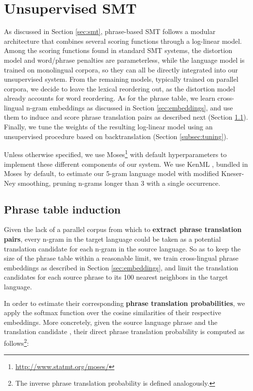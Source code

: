 \documentclass[11pt,a4paper]{article}
\begin{document}
\section{Unsupervised SMT} \label{sec:system}

As discussed in Section \ref{sec:smt}, phrase-based SMT follows a modular architecture that combines several scoring functions through a log-linear model. Among the scoring functions found in standard SMT systems, the distortion model and word/phrase penalties are parameterless, while the language model is trained on monolingual corpora, so they can all be directly integrated into our unsupervised system. From the remaining models, typically trained on parallel corpora, we decide to leave the lexical reordering out, as the distortion model already accounts for word reordering. As for the phrase table, we learn cross-lingual n-gram embeddings as discussed in Section \ref{sec:embeddings}, and use them to induce and score phrase translation pairs as described next (Section \ref{subsec:phrase_table_induction}). Finally, we tune the weights of the resulting log-linear model using an unsupervised procedure based on backtranslation (Section \ref{subsec:tuning}).

Unless otherwise specified, we use Moses\footnote{\url{http://www.statmt.org/moses/}} with default hyperparameters to implement these different components of our system. We use KenML \citep{heafield2013scalable}, bundled in Moses by default, to estimate our 5-gram language model with modified Kneser-Ney smoothing, pruning n-grams longer than 3 with a single occurrence.


\subsection{Phrase table induction} \label{subsec:phrase_table_induction}

Given the lack of a parallel corpus from which to \textbf{extract phrase translation pairs}, every n-gram in the target language could be taken as a potential translation candidate for each n-gram in the source language. So as to keep the size of the phrase table within a reasonable limit, we train cross-lingual phrase embeddings as described in Section \ref{sec:embeddings}, and limit the translation candidates for each source phrase to its 100 nearest neighbors in the target language.

In order to estimate their corresponding \textbf{phrase translation probabilities}, we apply the softmax function over the cosine similarities of their respective embeddings. More concretely, given the source language phrase  and the translation candidate , their direct phrase translation probability is computed as follows\footnote{The inverse phrase translation probability  is defined analogously.}:
\end{document}
